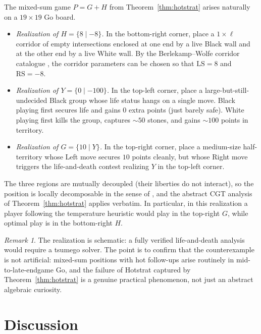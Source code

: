 \documentclass[11pt,a4paper]{amsart}
\theoremstyle{definition}
\theoremstyle{remark}
\newtheorem{remark}[theorem]{Remark}
\newcommand{\LS}{\mathrm{LS}}
\newcommand{\RS}{\mathrm{RS}}
\begin{document}
The mixed-sum game $P = G + H$ from Theorem~\ref{thm:hotstrat} arises
naturally on a $19 \times 19$ Go board.

\begin{itemize}[leftmargin=2em]
\item \emph{Realization of $H = \{8 \mid -8\}$.}
  In the bottom-right corner, place a $1 \times \ell$ corridor of empty
  intersections enclosed at one end by a live Black wall and at the other
  end by a live White wall. By the Berlekamp--Wolfe corridor catalogue
  \cite[Ch.~3]{BW1994}, the corridor parameters can be chosen so that
  $\LS = 8$ and $\RS = -8$.

\item \emph{Realization of $Y = \{0 \mid -100\}$.}
  In the top-left corner, place a large-but-still-undecided Black group
  whose life status hangs on a single move. Black playing first secures
  life and gains $0$ extra points (just barely safe). White playing first
  kills the group, captures $\sim 50$ stones, and gains $\sim 100$ points
  in territory.

\item \emph{Realization of $G = \{10 \mid Y\}$.}
  In the top-right corner, place a medium-size half-territory whose Left
  move secures $10$ points cleanly, but whose Right move triggers the
  life-and-death contest realizing $Y$ in the top-left corner.
\end{itemize}

The three regions are mutually decoupled (their liberties do not
interact), so the position is locally decomposable in the sense of
\cite[Ch.~4]{BW1994}, and the abstract CGT analysis of
Theorem~\ref{thm:hotstrat} applies verbatim. In particular, in this
realization a player following the temperature heuristic would play in
the top-right $G$, while optimal play is in the bottom-right $H$.

\begin{remark}\label{rem:realization}
The realization is schematic: a fully verified life-and-death analysis
would require a tsumego solver. The point is to confirm that the
counterexample is not artificial: mixed-sum positions with hot follow-ups
arise routinely in mid-to-late-endgame Go, and the failure of Hotstrat
captured by Theorem~\ref{thm:hotstrat} is a genuine practical phenomenon,
not just an abstract algebraic curiosity.
\end{remark}

\section{Discussion}\label{sec:discussion}
\end{document}
